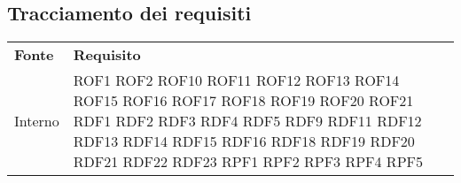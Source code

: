 \subsection{Tracciamento dei requisiti}
\begin{longtable}{| p{5cm} | p{5cm} |}
		\rowcolor{LightBlue}
		\color{white}\bfseries Fonte & \color{white}\bfseries Requisito \\[0.25cm]
		Interno & 	ROF1 \newline
					ROF2 \newline
					ROF10 \newline
					ROF11 \newline
					ROF12 \newline
					ROF13 \newline
					ROF14 \newline
					ROF15 \newline
					ROF16 \newline
					ROF17 \newline
					ROF18 \newline
					ROF19 \newline
					ROF20 \newline
					ROF21 \newline
					RDF1 \newline
					RDF2 \newline
					RDF3 \newline
					RDF4 \newline
					RDF5 \newline
					RDF9 \newline
					RDF11 \newline
					RDF12 \newline
					RDF13 \newline
					RDF14 \newline
					RDF15 \newline
					RDF16 \newline
					RDF18 \newline
					RDF19 \newline
					RDF20 \newline
					RDF21 \newline
					RDF22 \newline
					RDF23 \newline
					RPF1 \newline
					RPF2 \newline
					RPF3 \newline
					RPF4 \newline
					RPF5 \newline

\end{longtable}
